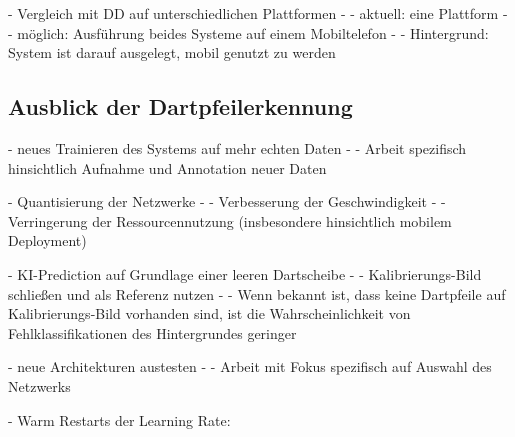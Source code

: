 - Vergleich mit DD auf unterschiedlichen Plattformen
- - aktuell: eine Plattform
- - möglich: Ausführung beides Systeme auf einem Mobiltelefon
- - Hintergrund: System ist darauf ausgelegt, mobil genutzt zu werden



\subsection{Ausblick der Dartpfeilerkennung}
\label{sec:ausblick_ki}

- neues Trainieren des Systems auf mehr echten Daten
- - Arbeit spezifisch hinsichtlich Aufnahme und Annotation neuer Daten

- Quantisierung der Netzwerke
- - Verbesserung der Geschwindigkeit
- - Verringerung der Ressourcennutzung (insbesondere hinsichtlich mobilem Deployment)

- KI-Prediction auf Grundlage einer leeren Dartscheibe
- - Kalibrierungs-Bild schließen und als Referenz nutzen
- - Wenn bekannt ist, dass keine Dartpfeile auf Kalibrierungs-Bild vorhanden sind, ist die Wahrscheinlichkeit von Fehlklassifikationen des Hintergrundes geringer

- neue Architekturen austesten
- - Arbeit mit Fokus spezifisch auf Auswahl des Netzwerks

- Warm Restarts der Learning Rate: \cite{lr_warm_restart}

